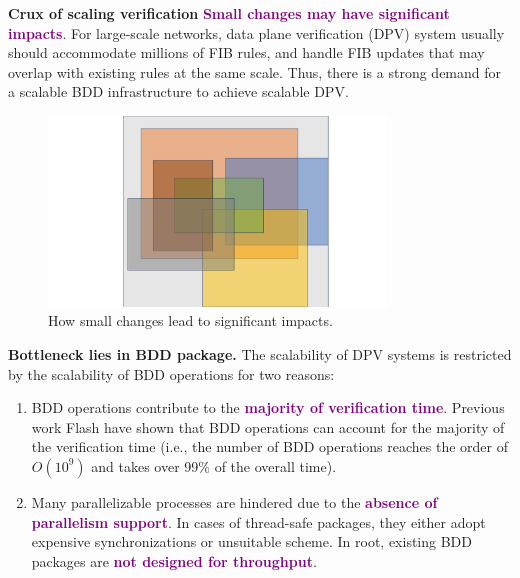 \documentclass[final]{beamer}
\newcommand{\efsz}[1]{\textcolor{purple}{\textbf{#1}}}
\newlength{\colwidthB}
\begin{document}
\begin{frame}[t]
\begin{columns}
\begin{column}[T]{\colwidthB}
\begin{block}{\Large{\textbf{Crux of scaling verification}}}
    \efsz{Small changes may have significant impacts}. For large-scale
    networks, data plane verification (DPV) system usually should accommodate
    millions of FIB rules, and handle FIB updates that may overlap with existing rules
    at the same scale. Thus, there is a strong demand for a scalable BDD infrastructure 
    to achieve scalable DPV.

    \vspace{1cm}
      \begin{figure}
      \centering
      \includegraphics[width=0.8\textwidth]{figures/space-partition.pdf}
      \caption{How small changes lead to significant impacts.}
      \end{figure}
    \vspace{-1cm}

    \end{block}
  \begin{block}{\Large{\textbf{Bottleneck lies in BDD package.}}}
  \large
  The scalability of DPV systems is restricted by the scalability of BDD operations for two reasons: 

  \begin{enumerate}
    \item BDD operations contribute to the \efsz{majority of verification time}. Previous work 
    Flash have shown that BDD operations can account for the majority of the verification time 
    (i.e., the number of BDD operations reaches the order of $O(10^9)$ and 
    takes over 99\% of the overall time).

    \item Many parallelizable processes are hindered due to the \efsz{absence of parallelism support}.
    In cases of thread-safe packages, they either adopt expensive synchronizations or unsuitable
    scheme. In root, existing BDD packages are \efsz{not designed for throughput}.
  \end{enumerate}


\end{block}
\end{column}
\end{columns}
\end{frame}
\end{document}
